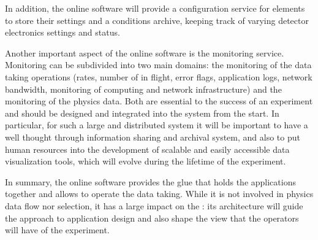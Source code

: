 In addition, the online software will provide a configuration service
for  elements to store their settings and a conditions
archive, keeping track of varying detector electronics settings and
status.

Another important aspect of the online software is the monitoring
service.
Monitoring can be subdivided into two main domains: the monitoring of
the data taking operations (rates, number of 
in flight, error flags, application logs, network bandwidth, monitoring
of computing and network infrastructure) and the monitoring of the
physics data.
Both are essential to the success of an experiment and should be
designed and integrated into the  system from the start.
In particular, for such a large and distributed system it will be
important to have a well thought through information sharing and
archival system, and also to put human resources into the development
of scalable and easily accessible data visualization tools, which will
evolve during the lifetime of the experiment.

In summary, the online software provides the glue that holds the
 applications together and allows to operate the data
taking.
While it is not involved in physics data flow nor selection, it has a
large impact on the : its architecture will guide the
approach to  application design and also shape the view
that the operators will have of the experiment.

